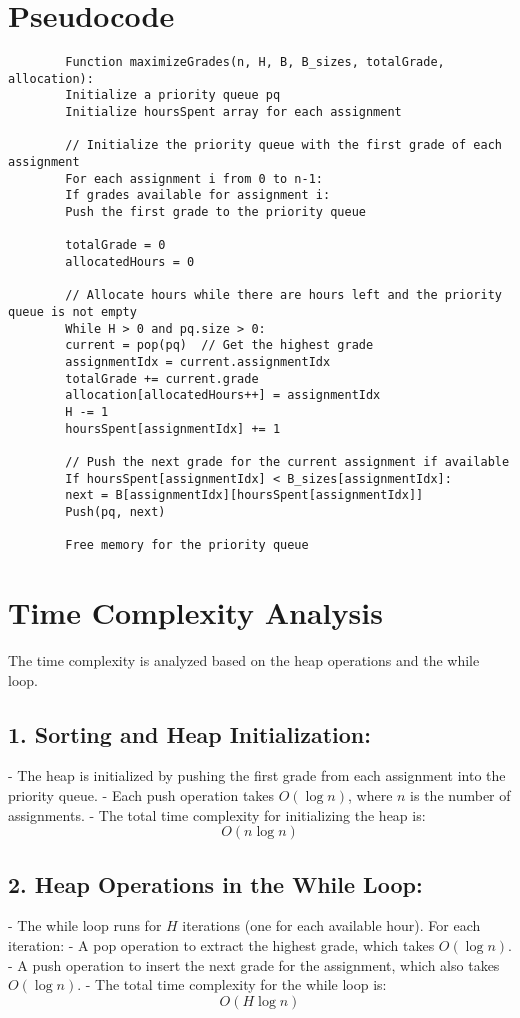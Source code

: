 \documentclass[a4paper,12pt]{report}
\begin{document}
\section*{Pseudocode}

\begin{tcolorbox}[colback=white, colframe=black, boxrule=0.5pt] 
	\ttfamily\small 
	\begin{verbatim}
		Function maximizeGrades(n, H, B, B_sizes, totalGrade, allocation):
		Initialize a priority queue pq
		Initialize hoursSpent array for each assignment
		
		// Initialize the priority queue with the first grade of each assignment
		For each assignment i from 0 to n-1:
		If grades available for assignment i:
		Push the first grade to the priority queue
		
		totalGrade = 0
		allocatedHours = 0
		
		// Allocate hours while there are hours left and the priority queue is not empty
		While H > 0 and pq.size > 0:
		current = pop(pq)  // Get the highest grade
		assignmentIdx = current.assignmentIdx
		totalGrade += current.grade
		allocation[allocatedHours++] = assignmentIdx
		H -= 1
		hoursSpent[assignmentIdx] += 1
		
		// Push the next grade for the current assignment if available
		If hoursSpent[assignmentIdx] < B_sizes[assignmentIdx]:
		next = B[assignmentIdx][hoursSpent[assignmentIdx]]
		Push(pq, next)
		
		Free memory for the priority queue
	\end{verbatim}
\end{tcolorbox}
\newpage

\section*{Time Complexity Analysis}

The time complexity is analyzed based on the heap operations and the while loop.

\subsection*{1. Sorting and Heap Initialization:}
- The heap is initialized by pushing the first grade from each assignment into the priority queue. 
- Each push operation takes \( O(\log n) \), where \( n \) is the number of assignments. 
- The total time complexity for initializing the heap is:
\[
O(n \log n)
\]

\subsection*{2. Heap Operations in the While Loop:}
- The while loop runs for \( H \) iterations (one for each available hour). For each iteration:
- A pop operation to extract the highest grade, which takes \( O(\log n) \).
- A push operation to insert the next grade for the assignment, which also takes \( O(\log n) \).
- The total time complexity for the while loop is:
\[
O(H \log n)
\]
\end{document}

